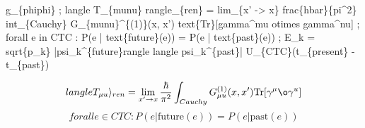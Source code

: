 
\begin{tzpsnapshot}
\end{tzpsnapshot}

g\_\{phiphi\} ; langle T\_\{munu\} rangle\_\{ren\} = lim\_\{x' -> x\} frac\{hbar\}\{pi\textasciicircum{}2\} int\_\{Cauchy\} G\_\{munu\}\textasciicircum{}\{(1)\}(x, x') text\{Tr\}[gamma\textasciicircum{}mu otimes gamma\textasciicircum{}nu] ; forall e in CTC : P(e | text\{future\}(e)) = P(e | text\{past\}(e)) ; E\_k = sqrt\{p\_k\} |psi\_k\textasciicircum{}\{future\}rangle langle psi\_k\textasciicircum{}\{past\}| U\_\{CTC\}(t\_\{present\} - t\_\{past\})

\[
langle T_{\mu u} \rangle_{ren} = \lim_{x' \to x} \frac{\hbar}{\pi^2} \int_{Cauchy} G_{\mu u}^{(1)}(x, x') \text{Tr}[\gamma^\mu \o\gamma^ u]
\]
\[
forall e \in CTC : P(e | \text{future}(e)) = P(e | \text{past}(e))
\]

